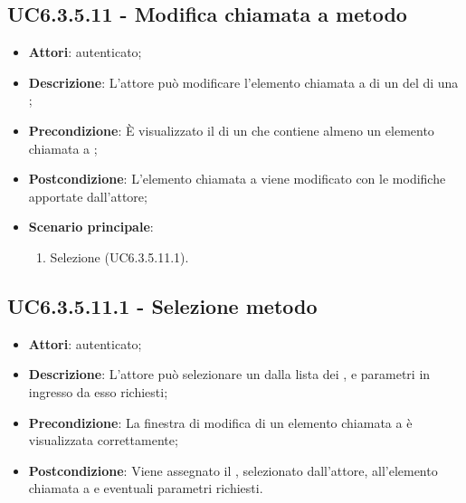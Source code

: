\subsection{UC6.3.5.11 - Modifica chiamata a metodo}
\label{ssec:UC6.3.5.11}
\begin{itemize}
\item \textbf{Attori}:  autenticato;
\item \textbf{Descrizione}: L'attore può modificare l'elemento chiamata a  di un  del  di una ;
\item \textbf{Precondizione}: È visualizzato il  di un  che contiene almeno un elemento chiamata a ;
\item \textbf{Postcondizione}: L'elemento chiamata a  viene modificato con le modifiche apportate dall'attore;
\item \textbf{Scenario principale}: \begin{enumerate}\item Selezione  (UC6.3.5.11.1).
 \end{enumerate}
\end{itemize}
\subsection{UC6.3.5.11.1 - Selezione metodo}
\label{ssec:UC6.3.5.11.1}
\begin{itemize}
\item \textbf{Attori}:  autenticato;
\item \textbf{Descrizione}: L'attore può selezionare un  dalla lista dei , e parametri in ingresso da esso richiesti;
\item \textbf{Precondizione}: La finestra di modifica di un elemento chiamata a  è visualizzata correttamente;
\item \textbf{Postcondizione}: Viene assegnato il , selezionato dall'attore, all'elemento chiamata a  e eventuali parametri richiesti.
\end{itemize}
